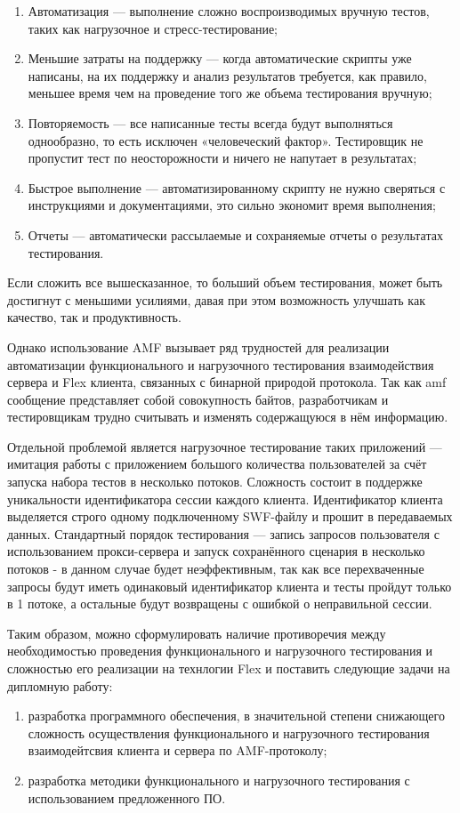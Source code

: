 \begin{enumerate}
\item Автоматизация --- выполнение сложно воспроизводимых вручную тестов, таких как нагрузочное
и стресс-тестирование;
\item Меньшие затраты на поддержку --- когда автоматические скрипты уже написаны, на их поддержку
и анализ результатов требуется, как правило, меньшее время чем на проведение того же объема тестирования вручную;
\item Повторяемость --- все написанные тесты всегда будут выполняться однообразно, то есть
исключен «человеческий фактор». Тестировщик не пропустит тест по неосторожности и ничего не
напутает в результатах;
\item Быстрое выполнение --- автоматизированному скрипту не нужно сверяться с инструкциями и
документациями, это сильно экономит время выполнения;
\item Отчеты --- автоматически рассылаемые и сохраняемые отчеты о результатах тестирования.
\end{enumerate}

Если сложить все вышесказанное, то больший объем тестирования, может быть
достигнут с меньшими усилиями, давая при этом возможность улучшать как качество, 
так и продуктивность. 

Однако использование AMF вызывает ряд трудностей для реализации автоматизации функционального 
и нагрузочного тестирования взаимодействия сервера и Flex клиента, связанных с бинарной 
природой протокола. Так как amf сообщение представляет собой совокупность байтов, 
разработчикам и тестировщикам трудно считывать и изменять содержащуюся в нём информацию.

Отдельной проблемой является нагрузочное тестирование таких приложений --- имитация работы с
приложением большого количества пользователей за счёт запуска набора тестов в несколько потоков. 
Сложность состоит в поддержке уникальности идентификатора сессии каждого клиента. Идентификатор 
клиента выделяется строго одному подключенному SWF-файлу и прошит в передаваемых данных.
Стандартный порядок тестирования --- запись запросов пользователя с использованием прокси-сервера
и запуск сохранённого сценария в несколько потоков - в данном случае будет неэффективным, так 
как все перехваченные запросы будут иметь одинаковый идентификатор клиента и тесты пройдут
только в 1 потоке, а остальные будут возвращены с ошибкой о неправильной сессии.
 
Таким образом, можно сформулировать наличие противоречия между необходимостью проведения функционального
и нагрузочного тестирования и сложностью его реализации на технлогии Flex и поставить следующие задачи на 
дипломную работу:

\begin{enumerate}
\item разработка программного обеспечения, в значительной степени снижающего сложность осуществления функционального
и нагрузочного тестирования взаимодейтсвия клиента и сервера по AMF-протоколу;
\item разработка методики функционального и нагрузочного тестирования с использованием предложенного ПО.
\end{enumerate}